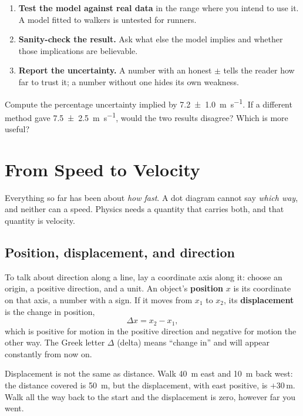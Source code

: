 \documentclass[11pt,twoside,openany]{book}
\newcounter{check}[chapter]
\begin{document}
\begin{keyidea}
\begin{enumerate}[itemsep=2pt,topsep=2pt]
  \item \textbf{Test the model against real data} in the range where you intend to use it. A model fitted to walkers is untested for runners.
  \item \textbf{Sanity-check the result.} Ask what else the model implies and whether those implications are believable.
  \item \textbf{Report the uncertainty.} A number with an honest $\pm$ tells the reader how far to trust it; a number without one hides its own weakness.
\end{enumerate}
\end{keyidea}

\begin{checkbox}
Compute the percentage uncertainty implied by \SI{7.2 \pm 1.0}{\metre\per\second}. If a different method gave \SI{7.5 \pm 2.5}{\metre\per\second}, would the two results disagree? Which is more useful?
\end{checkbox}

\section{From Speed to Velocity}
\label{sec:velocity}

Everything so far has been about \emph{how fast}. A dot diagram cannot say \emph{which way}, and neither can a speed. Physics needs a quantity that carries both, and that quantity is velocity.

\subsection{Position, displacement, and direction}

To talk about direction along a line, lay a coordinate axis along it: choose an origin, a positive direction, and a unit. An object's \textbf{position} $x$ is its coordinate on that axis, a number with a sign. If it moves from $x_1$ to $x_2$, its \textbf{displacement} is the change in position,
\[
\Delta x = x_2 - x_1,
\]
which is positive for motion in the positive direction and negative for motion the other way. The Greek letter $\Delta$ (delta) means ``change in'' and will appear constantly from now on.

Displacement is not the same as distance. Walk \SI{40}{\metre} east and \SI{10}{\metre} back west: the distance covered is \SI{50}{\metre}, but the displacement, with east positive, is $+30\,\si{\metre}$. Walk all the way back to the start and the displacement is zero, however far you went.
\end{document}

